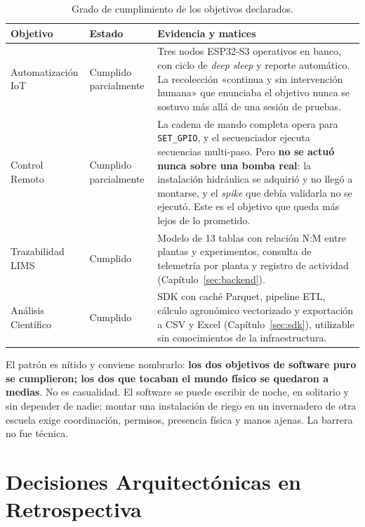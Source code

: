 \begin{table}[H]
    \centering
    \caption{Grado de cumplimiento de los objetivos declarados.}
    \label{tab:cumplimiento}
    \begin{tabular}{p{2.8cm}p{2.6cm}p{7cm}}
        \toprule
        \textbf{Objetivo} & \textbf{Estado} & \textbf{Evidencia y matices} \\
        \midrule
        Automatización IoT & Cumplido parcialmente &
        Tres nodos ESP32-S3 operativos en banco, con ciclo de \textit{deep sleep}
        y reporte automático. La recolección «continua y sin intervención humana»
        que enunciaba el objetivo nunca se sostuvo más allá de una sesión de
        pruebas. \\
        \midrule
        Control Remoto & Cumplido parcialmente &
        La cadena de mando completa opera para \texttt{SET\_GPIO}, y el
        secuenciador ejecuta secuencias multi-paso. Pero \textbf{no se actuó nunca
        sobre una bomba real}: la instalación hidráulica se adquirió y no llegó a
        montarse, y el \textit{spike} que debía validarla no se ejecutó. Este es
        el objetivo que queda más lejos de lo prometido. \\
        \midrule
        Trazabilidad LIMS & Cumplido &
        Modelo de 13 tablas con relación N:M entre plantas y experimentos,
        consulta de telemetría por planta y registro de actividad
        (Capítulo~\ref{sec:backend}). \\
        \midrule
        Análisis Científico & Cumplido &
        SDK con caché Parquet, pipeline ETL, cálculo agronómico vectorizado y
        exportación a CSV y Excel (Capítulo~\ref{sec:sdk}), utilizable sin
        conocimientos de la infraestructura. \\
        \bottomrule
    \end{tabular}
\end{table}

El patrón es nítido y conviene nombrarlo: \textbf{los dos objetivos de software puro
se cumplieron; los dos que tocaban el mundo físico se quedaron a medias}. No es
casualidad. El software se puede escribir de noche, en solitario y sin depender de
nadie; montar una instalación de riego en un invernadero de otra escuela exige
coordinación, permisos, presencia física y manos ajenas. La barrera no fue técnica.

\section{Decisiones Arquitectónicas en Retrospectiva}

